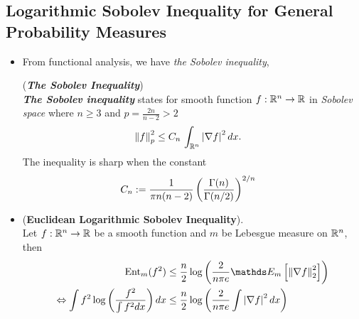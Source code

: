 \documentclass[11pt]{article}
\begin{document}
\subsection{Logarithmic Sobolev Inequality for General Probability Measures}
\begin{itemize}
\item From functional analysis, we have \emph{the Sobolev inequality}, 
\begin{remark} (\emph{\textbf{The Sobolev Inequality}}) \citep{evans2010partial}\\
\emph{\textbf{The Sobolev inequality}} states for smooth function $f: {\mathbb R}^n \to {\mathbb R}$ in \emph{Sobolev space} where $n \ge 3$ and $p = \frac{2n}{n-2} > 2$
\begin{align*}
\left\|f\right\|_{p}^2 &\le C_n \,\int_{{\mathbb R}^{n}}\left\lvert \nabla f \right\rvert^2 dx.
\end{align*} The inequality is sharp when the constant
\begin{align*}
C_n &:= \frac{1}{\pi n(n-2)}\left(\frac{\Gamma(n)}{\Gamma(n/2)}\right)^{2/n}
\end{align*}
\end{remark}

\item \begin{proposition} (\textbf{Euclidean Logarithmic Sobolev Inequality}). \\
Let $f: {\mathbb R}^n \to {\mathbb R}$ be a smooth function and $m$ be Lebesgue measure on ${\mathbb R}^n$, then
\begin{align}
\text{Ent}_{m}(f^2) &\le \frac{n}{2}\log\paren{\frac{2}{n \pi e} \E{m}{\norm{\nabla f}{2}^2} } \label{ineqn: log_sobolev_inequality_euclidean} \\
\Leftrightarrow \int f^2 \log\paren{\frac{f^2}{\int f^2 dx}} dx &\le \frac{n}{2}\log\paren{\frac{2}{n \pi e} \int \abs{\nabla f}^2 dx }
\nonumber
\end{align}
\end{proposition}


\end{itemize}
\end{document}
